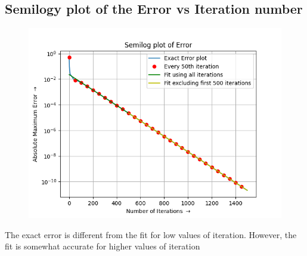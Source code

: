 \documentclass[12pt, a4paper]{article}
\begin{document}
\subsection{Semilogy plot of the Error vs Iteration number}
\vspace*{-0.5cm}
\begin{figure}[H]
    \centering
    \includegraphics[scale = 0.75]{Figure_2.png}
    \label{fig:sample}
\end{figure}
\vspace*{-0.5cm}
\begin{center}
    The exact error is different from the fit for low values of iteration. However,
the fit is somewhat accurate for higher values of iteration
\end{center}
\end{document}
